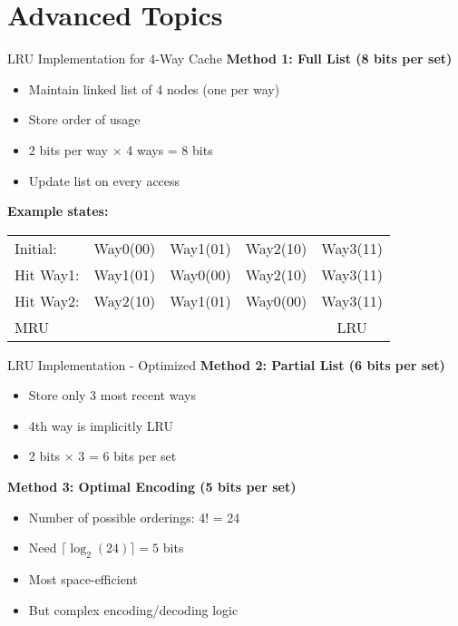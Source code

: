 \documentclass[aspectratio=169,12pt]{beamer}
\begin{document}
\section{Advanced Topics}
\begin{frame}{LRU Implementation for 4-Way Cache}
\textbf{Method 1: Full List (8 bits per set)}
\begin{itemize}
    \item Maintain linked list of 4 nodes (one per way)
    \item Store order of usage
    \item 2 bits per way $\times$ 4 ways = 8 bits
    \item Update list on every access
\end{itemize}

\textbf{Example states:}
\begin{center}
\begin{tabular}{|l|c|c|c|c|}
\hline
Initial: & Way0(00) & Way1(01) & Way2(10) & Way3(11) \\
Hit Way1: & Way1(01) & Way0(00) & Way2(10) & Way3(11) \\
Hit Way2: & Way2(10) & Way1(01) & Way0(00) & Way3(11) \\
\hline
\multicolumn{2}{l}{MRU} & & & LRU \\
\hline
\end{tabular}
\end{center}
\end{frame}

\begin{frame}{LRU Implementation - Optimized}
\textbf{Method 2: Partial List (6 bits per set)}
\begin{itemize}
    \item Store only 3 most recent ways
    \item 4th way is implicitly LRU
    \item 2 bits × 3 = 6 bits per set
\end{itemize}

\textbf{Method 3: Optimal Encoding (5 bits per set)}
\begin{itemize}
    \item Number of possible orderings: 4! = 24
    \item Need $\lceil \log_2(24) \rceil = 5$ bits
    \item Most space-efficient
    \item But complex encoding/decoding logic
\end{itemize}
\end{frame}
\end{document}

